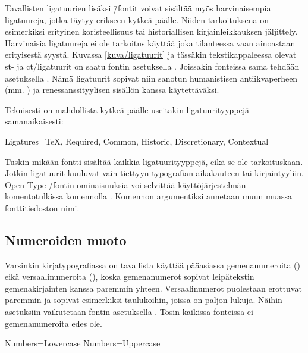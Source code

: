 \noindent
Tavallisten ligatuurien lisäksi  \=/fontit voivat
sisältää myös harvinaisempia ligatuureja, jotka täytyy erikseen kytkeä
päälle. Niiden tarkoituksena on esimerkiksi erityinen koristeellisuus
tai historiallisen kirjainleikkauksen jäljittely. Harvinaisia
ligatuureja ei ole tarkoitus käyttää joka tilanteessa vaan ainoastaan
erityisestä syystä. Kuvassa \ref{kuva/ligatuurit} ja tässäkin
tekstikappaleessa olevat {%
  \newcommand{\hlig}[1]{{#1}}%
  \hlig{st}- ja \hlig{ct}\-/ligatuurit%
} on saatu fontin asetuksella .
Joissakin fonteissa sama tehdään asetuksella . Nämä ligatuurit sopivat niin sanotun humanistisen
antiikvaperheen (mm. ) ja renessanssityylisen
sisällön kanssa käytettäväksi.

Teknisesti on mahdollista kytkeä päälle useitakin ligatuurityyppejä
samanaikaisesti:

\begin{koodilohkosis}
Ligatures={TeX, Required, Common, Historic, Discretionary,
  Contextual}
\end{koodilohkosis}

\noindent
Tuskin mikään fontti sisältää kaikkia ligatuurityyppejä, eikä se ole
tarkoituskaan. Jotkin ligatuurit kuuluvat vain tiettyyn typografian
aikakauteen tai kirjaintyyliin. Open Type \=/fontin ominaisuuksia voi
selvittää käyttöjärjestelmän komentotulkissa komennolla .
Komennon argumentiksi annetaan muun muassa fonttitiedoston nimi.

\subsection{Numeroiden muoto}
\label{luku/fontit-numerot}

Varsinkin kirjatypografiassa on tavallista käyttää pääasiassa
gemenanumeroita ({}) eikä versaalinumeroita
({}), koska gemenanumerot sopivat leipätekstin
gemenakirjainten kanssa paremmin yhteen. Versaalinumerot puolestaan
erottuvat paremmin ja sopivat esimerkiksi taulukoihin, joissa on paljon
lukuja. Näihin asetuksiin vaikutetaan fontin asetuksella
. Tosin kaikissa fonteissa ei gemenanumeroita edes ole.

\begin{koodilohkosis}
Numbers=Lowercase %
Numbers=Uppercase %
\end{koodilohkosis}

